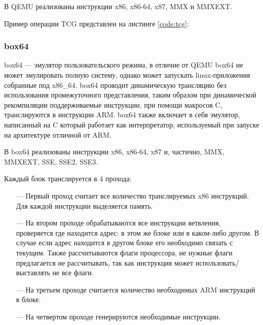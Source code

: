В QEMU реализованы инструкции x86, x86-64, x87, MMX и MMXEXT. 

Пример операции TCG представлен на листинге \ref{code:tcg}:


\subsubsection{box64}

box64 --- эмулятор пользовательского режима, в отличие от QEMU box64 не может эмулировать полную систему, однако может запускать linux-приложения собранные под x86\_64. box64 проводит динамическую трансляцию без использования промежуточного представления, таким образом при динамической рекомпиляции поддерживаемые инструкции, при помощи макросов C, транслируются в инструкции ARM. box64 также включает в себя эмулятор, написанный на C который работает как интерпретатор, используемый при запуске на архитектуре отличной от ARM. \cite{box64_letter}

В box64 реализованы инструкции x86, x86-64, x87 и, частично, MMX, MMXEXT, SSE, SSE2, SSE3. 

Каждый блок транслируется в 4 прохода:
\begin{itemize}[leftmargin=1.6\parindent]
	\item[---] Первый проход считает все количество транслируемых x86 инструкций. Для каждой инструкции выделяется память.
	\item[---] На втором проходе обрабатываются все инструкции ветвления, проверяется где находится адрес: в этом же блоке или в каком-либо другом. В случае если адрес находится в другом блоке его необходимо связать с текущим. Также рассчитываются флаги процессора, не нужные флаги предлагается не рассчитывать, так как инструкция может использовать/выставлять не все флаги.
	\item[---] На третьем проходе считается количество необходимых ARM инструкций в блоке.
	\item[---] На четвертом проходе генерируются необходимые инструкции.
\end{itemize}

